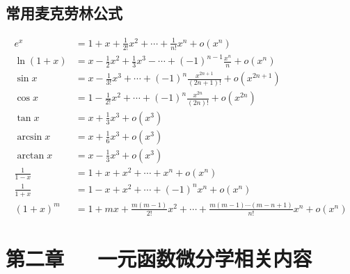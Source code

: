\documentclass[UTF8]{ctexart}
\theoremstyle{remark}
\begin{document}
	\subsection{常用麦克劳林公式}
	\begin{align*}
		e^x &= 1 + x + \frac{1}{2!}x^2 + \cdots + \frac{1}{n!}x^n + o(x^n)\\
		\ln(1 + x) &= x - \frac{1}{2}x^2 + \frac{1}{3}x^3 - \cdots + (-1)^{n - 1}\frac{x^n}{n} + o(x^n)\\
		\sin x &= x - \frac{1}{3!}x^3 + \cdots + (-1)^n\frac{x^{2n + 1}}{(2n + 1)!} + o(x^{2n + 1})\\
		\cos x &= 1 - \frac{1}{2!}x^2 + \cdots + (-1)^n\frac{x^{2n}}{(2n)!} + o(x^{2n})\\
		\tan x &= x + \frac{1}{3}x^3 + o(x^3)\\
		\arcsin x &= x + \frac{1}{6}x^3 + o(x^3)\\
		\arctan x &= x - \frac{1}{3}x^3 + o(x^3)\\
		\frac{1}{1 - x} &= 1 + x + x^2 + \cdots + x^n + o(x^n)\\
		\frac{1}{1 + x} &= 1 - x + x^2 + \cdots + (-1)^nx^n + o(x^n)\\
		(1 + x)^m &= 1 + mx + \frac{m(m - 1)}{2!}x^2 + \cdots + \frac{m(m - 1)\cdots(m - n + 1)}{n!}x^n + o(x^n)
	\end{align*}
	
	\section{第二章~~~一元函数微分学相关内容}
\end{document}
